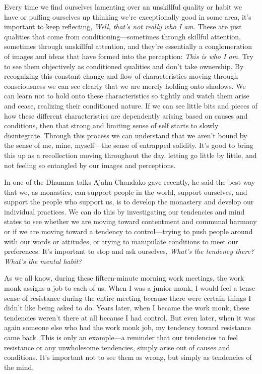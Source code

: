 Every time we find ourselves lamenting over an unskillful quality or 
habit we have or puffing ourselves up thinking we're exceptionally good 
in some area, it's important to keep reflecting, \emph{Well, that's not 
really who I am.} These are just qualities that come from 
conditioning---sometimes through skillful attention, sometimes through 
unskillful attention, and they're essentially a conglomeration of 
images and ideas that have formed into the perception: \emph{This is 
who I am.} Try to see them objectively as conditioned qualities and 
don't take ownership. By recognizing this constant change and flow of 
characteristics moving through consciousness we can see clearly that we 
are merely holding onto shadows. We can learn not to hold onto these 
characteristics so tightly and watch them arise and cease, realizing 
their conditioned nature. If we can see little bits and pieces of how 
these different characteristics are dependently arising based on causes 
and conditions, then that strong and limiting sense of self starts to 
slowly disintegrate. Through this process we can understand that we 
aren't bound by the sense of me, mine, myself---the sense of entrapped 
solidity. It's good to bring this up as a recollection moving 
throughout the day, letting go little by little, and not feeling so 
entangled by our images and perceptions.


In one of the Dhamma talks Ajahn Chandako gave recently, he said the 
best way that we, as monastics, can support people in the world, 
support ourselves, and support the people who support us, is to develop 
the monastery and develop our individual practices. We can do this by 
investigating our tendencies and mind states to see whether we are 
moving toward contentment and communal harmony or if we are moving 
toward a tendency to control---trying to push people around with our 
words or attitudes, or trying to manipulate conditions to meet our 
preferences. It's important to stop and ask ourselves, \emph{What's the 
tendency there? What's the mental habit?}

As we all know, during these fifteen-minute morning work meetings, the 
work monk assigns a job to each of us. When I was a junior monk, I 
would feel a tense sense of resistance during the entire meeting 
because there were certain things I didn't like being asked to do. 
Years later, when I became the work monk, these tendencies weren't 
there at all because I had control. But even later, when it was again 
someone else who had the work monk job, my tendency toward resistance 
came back. This is only an example---a reminder that our tendencies to 
feel resistance or any unwholesome tendencies, simply arise out of 
causes and conditions. It's important not to see them as wrong, but 
simply as tendencies of the mind.

